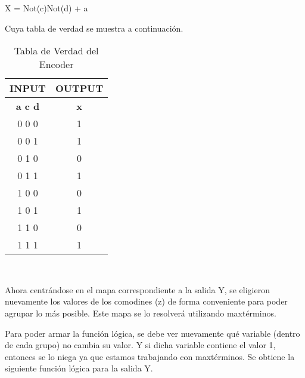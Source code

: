 \begin{center}
X = Not(c)Not(d) + a
\end{center}
Cuya tabla de verdad se muestra a continuación.
\begin{center}
	\begin{table}[h!]
		\begin{center}
			\caption{Tabla de Verdad del Encoder}
			\begin{tabular}{|c|c|}
				\hline
				\textbf{INPUT} & \textbf{OUTPUT} \\
				\hline
				\textbf{a c d} & \textbf{x} \\
				\hline
				0 0 0 & 1\\
				\hline
				0 0 1 & 1 \\
				\hline
				0 1 0 & 0\\
				\hline
				0 1 1 & 1\\
				\hline
				1 0 0 & 0\\
				\hline
				1 0 1 & 1\\
				\hline
				1 1 0 & 0\\
				\hline
				1 1 1 & 1\\
				\hline
			\end{tabular} \\
		\end{center}
	\end{table}
\end{center}

Ahora centr\'andose en el mapa correspondiente a la salida Y, se eligieron nuevamente los valores de los comodines (z) de forma conveniente para poder agrupar lo m\'as posible. Este mapa se lo resolver\'a utilizando maxt\'erminos.

\begin{center}
\begin{Karnaugh}
\end{Karnaugh}
\end{center}

Para poder armar la funci\'on l\'ogica, se debe ver nuevamente qu\'e variable (dentro de cada grupo) no cambia su valor. Y si dicha variable contiene el valor 1, entonces se lo niega ya que estamos trabajando con maxt\'erminos. Se obtiene la siguiente funci\'on l\'ogica para la salida Y.

